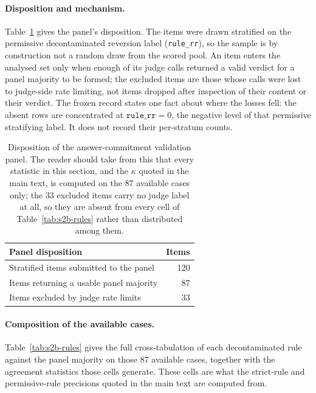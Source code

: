\documentclass[letterpaper]{article}
\begin{document}
\paragraph{Disposition and mechanism.}
Table~\ref{tab:s2b-disposition} gives the panel's disposition.  The items were
drawn stratified on the permissive decontaminated reversion label
(\texttt{rule\_rr}), so the sample is by construction not a random draw from the
scored pool.  An item enters the analysed set only when enough of its judge
calls returned a valid verdict for a panel majority to be formed; the excluded
items are those whose calls were lost to judge-side rate limiting, not items
dropped after inspection of their content or their verdict.  The frozen record
states one fact about where the losses fell: the absent rows are concentrated at
\(\texttt{rule\_rr}=0\), the negative level of that permissive stratifying
label.  It does not record their per-stratum counts.

\begin{table}[t]
\centering
\begin{tabular}{lr}
\toprule
Panel disposition & Items \\
\midrule
Stratified items submitted to the panel & 120 \\
Items returning a usable panel majority & 87 \\
Items excluded by judge rate limits & 33 \\
\bottomrule
\end{tabular}
\caption{Disposition of the answer-commitment validation panel.  The reader
should take from this that every statistic in this section, and the
\(\kappa\) quoted in the main text, is computed on the \(87\) available cases
only; the \(33\) excluded items carry no judge label at all, so they are absent
from every cell of Table~\ref{tab:s2b-rules} rather than distributed among
them.}
\label{tab:s2b-disposition}
\end{table}

\paragraph{Composition of the available cases.}
Table~\ref{tab:s2b-rules} gives the full cross-tabulation of each
decontaminated rule against the panel majority on those \(87\) available cases,
together with the agreement statistics those cells generate.  These cells are
what the strict-rule and permissive-rule precisions quoted in the main text are
computed from.
\end{document}
